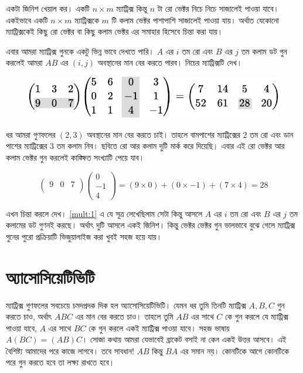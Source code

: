 \noindent একটা জিনিশ খেয়াল কর। একটি $n \times m$ ম্যাট্রিক্স কিন্তু $n$ টা রো ভেক্টর নিচে নিচে সাজালেই পাওয়া যাবে। একইভাবে একটি $n \times m$ ম্যাট্রিক্সকে $m$ টি কলাম ভেক্টর পাশাপাশি সাজালেই পাওয়া যায়। অর্থাত যেকোনো ম্যাট্রিক্সকেই কিছু রো ভেক্টর বা কিছু কলাম ভেক্টর এর সমাহার হিসেবে চিন্তা করা যায়।

\noindent এবার আমরা ম্যাট্রিক্স গুনকে একটু ভিন্ন ভাবে দেখতে পারি। $A$ এর $i$ তম রো এবং $B$ এর $j$ তম কলাম ডট গুন করলেই আমরা $AB$ এর $(i, j)$ অবস্থানের মান বের করতে পারব। নিচের ম্যাট্রিক্সটি দেখ।

\begin{figure}[h]
  \centering
  \includegraphics[scale=0.8]{./img/mat-expo/multiply.pdf}
\end{figure}

\noindent ধর আমরা গুণফলের $(2, 3)$ অবস্থানের মান বের করতে চাই। তাহলে বামপাশের ম্যাট্রিক্সের $2$ তম রো এবং ডান পাশের ম্যাট্রিক্সের $3$ তম কলাম নিব। ছবিতে রো আর কলাম দুটি মার্ক করে দিয়েছি। এবার এই রো ভেক্টর আর কলাম ভেক্টর গুন করলেই কাঙ্ক্ষিত সংখ্যাটি পেয়ে যাব।

$$
\begin{pmatrix}
9 & 0 & 7\\
\end{pmatrix}
\begin{pmatrix}
0 \\
-1 \\
4
\end{pmatrix} =
(9 \times 0) + (0 \times -1) + (7 \times 4) = \boxed{28}
$$

\noindent এখন চিন্তা করলে দেখ। \eqref{mult:1} এ যে সূত্র লেখেছিলাম সেটা কিন্তু আসলে $A$ এর $i$ তম রো এবং $B$ এর $j$ তম কলামের ডট গুণনই করছে। অর্থাৎ দুটি আসলে একই জিনিশ। কিন্তু ভেক্টর ভেক্টর গুন ভালভাবে বুঝে গেলে ম্যাট্রিক্স গুনের পুরো প্রক্রিয়াটি ভিজুয়ালাইজ করা খুবই সহজ হয়ে যায়।

\section{অ্যাসোসিয়েটিভিটি}

\noindent ম্যাট্রিক্স গুণফলের সবচেয়ে চমদপ্রদক দিক হল অ্যাসোসিয়েটিভিটি। যেমন ধর তুমি তিনটি ম্যাট্রিক্স $A, B, C$ গুন করতে চাও, অর্থাৎ $ABC$ এর মান বের করতে চাও। তাহলে তুমি $AB$ এর সাথে $C$ কে গুন করলে যে ম্যাট্রিক্স পাওয়া যাবে, $A$ এর সাথে $BC$ কে গুন করলে একই ম্যাট্রিক্স পাওয়া যাবে। সহজ ভাষায় $A(BC) = (AB)C$। সোজা কথায় আমরা যেভাবেই ব্রাকেট বসাই না কেন একই উত্তর আসবে। এই বৈশিষ্ট্য আমাদের পরে কাজে লাগবে। তবে সাবধান! $AB$ কিন্তু $BA$ এর সমান নয়। কোনটিকে আগে কোনটিকে পরে গুন করতে হবে তা লক্ষ্য রাখতে হবে।

